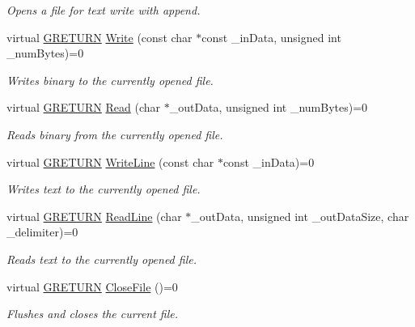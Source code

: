 \begin{DoxyCompactItemize}
\begin{DoxyCompactList}\small\item\em Opens a file for text write with append. \end{DoxyCompactList}\item 
virtual \hyperlink{namespace_g_w_a69b1aaebac1cac8049825f035884c95b}{G\+R\+E\+T\+U\+RN} \hyperlink{class_g_w_1_1_c_o_r_e_1_1_g_file_a74d36f83b8040d3563123670df151da9}{Write} (const char $\ast$const \+\_\+in\+Data, unsigned int \+\_\+num\+Bytes)=0
\begin{DoxyCompactList}\small\item\em Writes binary to the currently opened file. \end{DoxyCompactList}\item 
virtual \hyperlink{namespace_g_w_a69b1aaebac1cac8049825f035884c95b}{G\+R\+E\+T\+U\+RN} \hyperlink{class_g_w_1_1_c_o_r_e_1_1_g_file_a4f4fd35363a79e61955637e44b776628}{Read} (char $\ast$\+\_\+out\+Data, unsigned int \+\_\+num\+Bytes)=0
\begin{DoxyCompactList}\small\item\em Reads binary from the currently opened file. \end{DoxyCompactList}\item 
virtual \hyperlink{namespace_g_w_a69b1aaebac1cac8049825f035884c95b}{G\+R\+E\+T\+U\+RN} \hyperlink{class_g_w_1_1_c_o_r_e_1_1_g_file_a0f98b53d3e5ca664830653d2ce09135e}{Write\+Line} (const char $\ast$const \+\_\+in\+Data)=0
\begin{DoxyCompactList}\small\item\em Writes text to the currently opened file. \end{DoxyCompactList}\item 
virtual \hyperlink{namespace_g_w_a69b1aaebac1cac8049825f035884c95b}{G\+R\+E\+T\+U\+RN} \hyperlink{class_g_w_1_1_c_o_r_e_1_1_g_file_a44f806a2a2dbef8c346d6235c9137147}{Read\+Line} (char $\ast$\+\_\+out\+Data, unsigned int \+\_\+out\+Data\+Size, char \+\_\+delimiter)=0
\begin{DoxyCompactList}\small\item\em Reads text to the currently opened file. \end{DoxyCompactList}\item 
virtual \hyperlink{namespace_g_w_a69b1aaebac1cac8049825f035884c95b}{G\+R\+E\+T\+U\+RN} \hyperlink{class_g_w_1_1_c_o_r_e_1_1_g_file_aa27e2ab5af9fa18400f8bad9ea4deb39}{Close\+File} ()=0
\begin{DoxyCompactList}\small\item\em Flushes and closes the current file. \end{DoxyCompactList}\item 

\end{DoxyCompactItemize}

